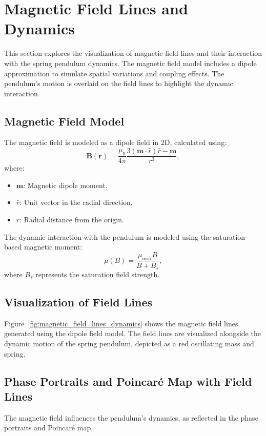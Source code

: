 \documentclass[12pt]{article}
\begin{document}
\section{Magnetic Field Lines and Dynamics}

This section explores the visualization of magnetic field lines and their interaction with the spring pendulum dynamics. The magnetic field model includes a dipole approximation to simulate spatial variations and coupling effects. The pendulum's motion is overlaid on the field lines to highlight the dynamic interaction.

\subsection{Magnetic Field Model}
The magnetic field is modeled as a dipole field in 2D, calculated using:
\[
\mathbf{B}(\mathbf{r}) = \frac{\mu_0}{4\pi} \frac{3(\mathbf{m} \cdot \hat{r}) \hat{r} - \mathbf{m}}{r^3},
\]
where:
\begin{itemize}
    \item \( \mathbf{m} \): Magnetic dipole moment.
    \item \( \hat{r} \): Unit vector in the radial direction.
    \item \( r \): Radial distance from the origin.
\end{itemize}
The dynamic interaction with the pendulum is modeled using the saturation-based magnetic moment:
\[
\mu(B) = \frac{\mu_{\text{max}} B}{B + B_s},
\]
where \( B_s \) represents the saturation field strength.

\subsection{Visualization of Field Lines}
Figure~\ref{fig:magnetic_field_lines_dynamics} shows the magnetic field lines generated using the dipole field model. The field lines are visualized alongside the dynamic motion of the spring pendulum, depicted as a red oscillating mass and spring.

\subsection{Phase Portraits and Poincaré Map with Field Lines}
The magnetic field influences the pendulum's dynamics, as reflected in the phase portraits and Poincaré map.
\end{document}
